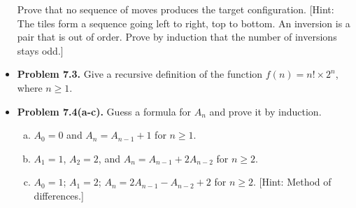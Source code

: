 \documentclass[11pt]{article}
\begin{document}
\begin{itemize}
  Prove that no sequence of moves produces the target configuration.
  [Hint: The tiles form a sequence going left to right, top to bottom.
  An inversion is a pair that is out of order.
  Prove by induction that the number of inversions stays odd.]

\vspace{0.1in}

\item \textbf{Problem 7.3.}
  Give a recursive definition of the function $f(n)=n!\times 2^n$, where $n\ge 1$.

\vspace{0.1in}

\item \textbf{Problem 7.4(a-c).}
  Guess a formula for $A_n$ and prove it by induction.
  \begin{enumerate}[(a)]
  \item $A_0=0$ and $A_n=A_{n-1}+1$ for $n\ge 1$.
  \item $A_1=1$, $A_2=2$, and $A_n=A_{n-1}+2A_{n-2}$ for $n\ge 2$.
  \item $A_0=1$; $A_1=2$; $A_n=2A_{n-1}-A_{n-2}+2$ for $n\ge 2$.
    [Hint: Method of differences.]
  \end{enumerate}

\end{itemize}
\end{document}
